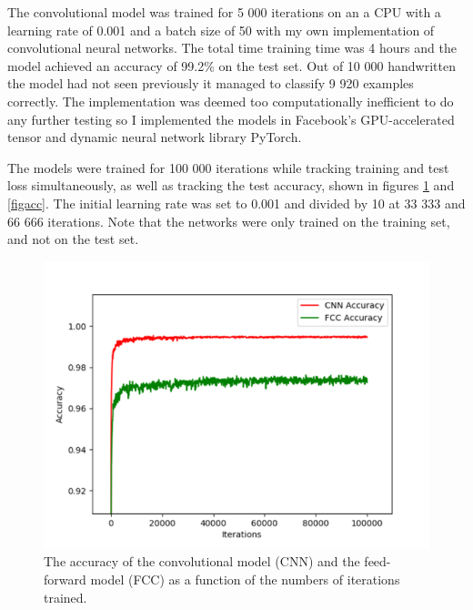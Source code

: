 \documentclass[a4paper,11pt,twoside]{article}
\begin{document}
The convolutional model was trained for 5 000 iterations on an a CPU with a learning rate of 0.001 and a batch size of 50 with my own implementation of convolutional neural networks. The total time training time was 4 hours and the model achieved an accuracy of 99.2\% on the test set. Out of 10 000 handwritten the model had not seen previously it managed to classify 9 920 examples correctly. The implementation was deemed too computationally inefficient to do any further testing so I implemented the models in Facebook's GPU-accelerated tensor and dynamic neural network library PyTorch.

The models were trained for 100 000 iterations while tracking training and test loss simultaneously, as well as tracking the test accuracy, shown in figures \ref{figloss} and \ref{figacc}. The initial learning rate was set to 0.001 and divided by 10 at 33 333 and 66 666 iterations. Note that the networks were only trained on the training set, and not on the test set.

\begin{figure}[h]
	\centering
  		\includegraphics[scale=0.4]{accuracy.png}
  	\caption{The accuracy of the convolutional model (CNN) and the feed-forward model (FCC) as a function of the numbers of iterations trained.} \label{figloss}
\end{figure}
\end{document}

